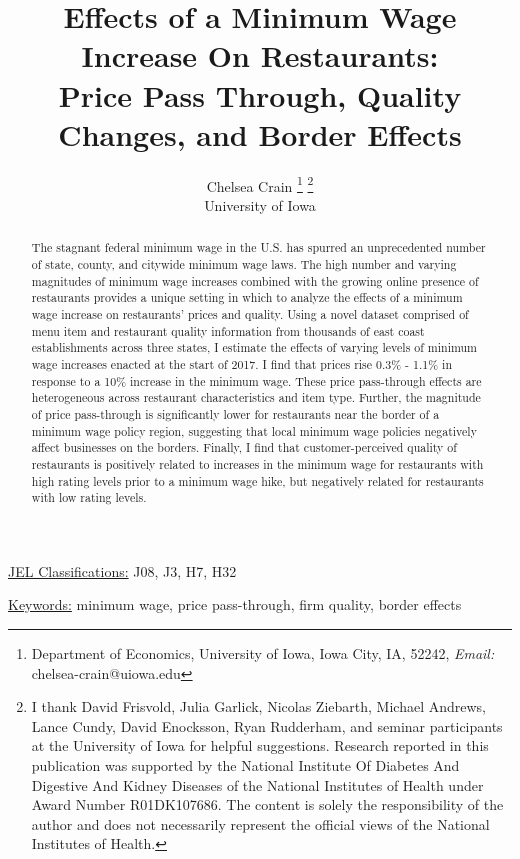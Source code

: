 \documentclass[11pt]{article}
\title{Effects of a  Minimum Wage Increase On Restaurants:  \\ Price Pass Through, Quality Changes, and Border Effects}
\author{Chelsea Crain \footnote{Department of Economics, University of Iowa, Iowa City, IA, 52242, \textit{Email: }chelsea-crain@uiowa.edu } \thanks{I thank David Frisvold, Julia Garlick, Nicolas Ziebarth, Michael Andrews, Lance Cundy, David Enocksson, Ryan Rudderham, and seminar participants at the University of Iowa for helpful suggestions. Research reported in this publication was supported by the National Institute Of Diabetes And Digestive
And Kidney Diseases of the National Institutes of Health under Award Number R01DK107686.
The content is solely the responsibility of the author and does not necessarily represent the official views of the National Institutes of Health.} \\ University of Iowa}
\begin{document}
\maketitle

\begin{abstract}
The stagnant federal minimum wage in the U.S. has spurred an unprecedented number of state, county, and citywide minimum wage laws. The high number and varying magnitudes of minimum wage increases combined with the growing online presence of restaurants provides a unique setting in which to analyze the effects of a minimum wage increase on restaurants' prices and quality. Using a novel dataset comprised of menu item and restaurant quality information from thousands of east coast establishments across three states, I estimate the effects of varying levels of minimum wage increases enacted at the start of 2017. I find that prices rise 0.3\% - 1.1\% in response to a 10\% increase in the minimum wage. These price pass-through effects are heterogeneous across restaurant characteristics and item type. Further, the magnitude of price pass-through is significantly lower for restaurants near the border of a minimum wage policy region, suggesting that local minimum wage policies negatively affect businesses on the borders. Finally, I find that customer-perceived quality of restaurants is positively related to increases in the minimum wage for restaurants with high rating levels prior to a minimum wage hike, but negatively related for restaurants with low rating levels. 


\end{abstract}



\underline{JEL Classifications:} J08, J3, H7, H32 

\underline{Keywords:} minimum wage, price pass-through, firm quality, border effects

\newpage
\end{document}
